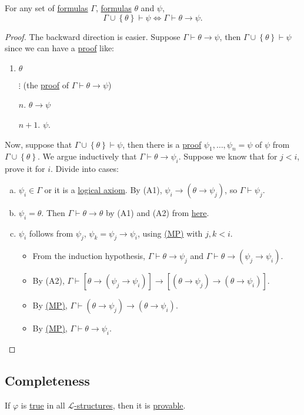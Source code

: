 \begin{theorem}\label{thm:deduction}
	For any set of \hyperref[def:formula]{formulas} \(\Gamma \), \hyperref[def:formula]{formulas} \(\theta \) and \(\psi \),
	\[
		\Gamma \cup \left\{ \theta  \right\} \vdash \psi
		\iff \Gamma \vdash \theta \to \psi .
	\]
\end{theorem}
\begin{proof}
	The backward direction is easier. Suppose \(\Gamma \vdash \theta \to \psi \), then \(\Gamma \cup \left\{ \theta \right\} \vdash \psi \) since we can have a \hyperref[def:proof]{proof} like:
	\begin{enumerate}
		\item \(\theta \)
		\item[] \(\vdots\) (the \hyperref[def:proof]{proof} of \(\Gamma \vdash \theta \to \psi \))
		\item[\(n\).] \(\theta \to \psi \)
		\item[\(n+1\).] \(\psi \).
	\end{enumerate}

	Now, suppose that \(\Gamma \cup \left\{ \theta \right\} \vdash \psi \), then there is a \hyperref[def:proof]{proof} \(\psi _1, \ldots , \psi _n = \psi \) of \(\psi \) from \(\Gamma \cup \left\{ \theta \right\} \). We argue inductively that \(\Gamma \vdash \theta \to \psi _i\). Suppose we know that for \(j < i\), prove it for \(i\). Divide into cases:
	\begin{enumerate}[(a)]
		\item \(\psi _i \in \Gamma \) or it is a \hyperref[def:logical-axioms]{logical axiom}. By (A1), \(\psi _i \to (\theta \to \psi _j)\), so \(\Gamma \vdash \psi _j\).
		\item \(\psi _i = \theta \). Then \(\Gamma \vdash \theta \to \theta \) by (A1) and (A2) from \hyperref[prob:lec6]{here}.
		\item \(\psi _i\) follows from \(\psi _j\), \(\psi _k = \psi _j \to \psi _i\), using \hyperref[def:rule-of-inference]{(MP)} with \(j, k < i\).
		      \begin{itemize}
			      \item From the induction hypothesis, \(\Gamma \vdash \theta \to \psi _j\) and \(\Gamma \vdash \theta \to (\psi _j \to \psi _i)\).
			      \item By (A2), \(\Gamma \vdash \left[ \theta \to (\psi _j \to \psi _i) \right] \to \left[ (\theta \to \psi _j) \to (\theta \to \psi _i) \right] \).
			      \item By \hyperref[def:rule-of-inference]{(MP)}, \(\Gamma \vdash (\theta \to \psi _j) \to (\theta \to \psi _i)\).
			      \item By \hyperref[def:rule-of-inference]{(MP)}, \(\Gamma \vdash \theta \to \psi _i\).
		      \end{itemize}
	\end{enumerate}
\end{proof}

\subsection{Completeness}
If \(\varphi \) is \hyperref[def:truth]{true} in all \hyperref[def:structure]{\(\mathcal{L} \)-structures}, then it is \hyperref[def:proof]{provable}.